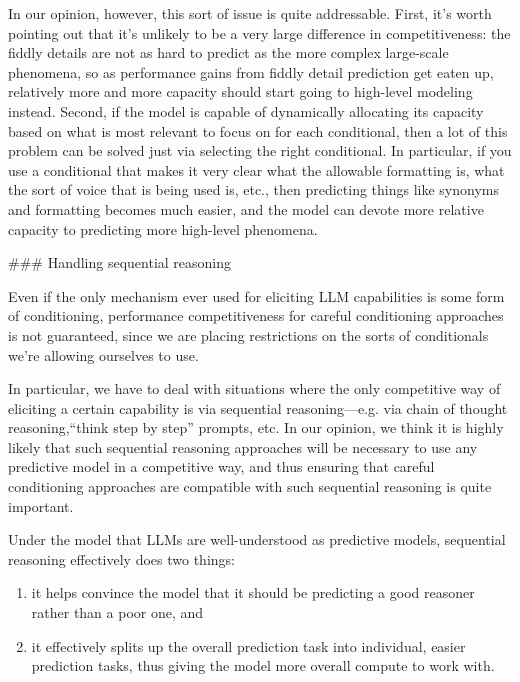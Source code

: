 {In our opinion, however, this sort of issue is quite addressable. First, it's worth pointing out that it's unlikely to be a very large difference in competitiveness: the fiddly details are not as hard to predict as the more complex large-scale phenomena, so as performance gains from fiddly detail prediction get eaten up, relatively more and more capacity should start going to high-level modeling instead. Second, if the model is capable of dynamically allocating its capacity based on what is most relevant to focus on for each conditional, then a lot of this problem can be solved just via selecting the right conditional. In particular, if you use a conditional that makes it very clear what the allowable formatting is, what the sort of voice that is being used is, etc., then predicting things like synonyms and formatting becomes much easier, and the model can devote more relative capacity to predicting more high-level phenomena.


### Handling sequential reasoning

Even if the only mechanism ever used for eliciting LLM capabilities is some form of conditioning, performance competitiveness for careful conditioning approaches is not guaranteed, since we are placing restrictions on the sorts of conditionals we're allowing ourselves to use.

In particular, we have to deal with situations where the only competitive way of eliciting a certain capability is via sequential reasoning---e.g. via chain of thought reasoning,``think step by step\cite{TODO: cite https://twitter.com/arankomatsuzaki/status/1529278580189908993}'' prompts, etc. In our opinion, we think it is highly likely that such sequential reasoning approaches will be necessary to use any predictive model in a competitive way, and thus ensuring that careful conditioning approaches are compatible with such sequential reasoning is quite important.

Under the model that LLMs are well-understood as predictive models, sequential reasoning effectively does two things:



\begin{enumerate}
\item it helps convince the model that it should be predicting a good reasoner rather than a poor one, and
\item it effectively splits up the overall prediction task into individual, easier prediction tasks, thus giving the model more overall compute to work with.
\end{enumerate}

}
